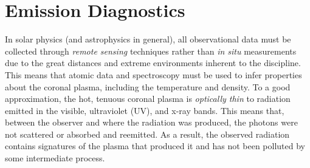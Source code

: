\chapter{Emission Diagnostics}
\label{ch:emission}
%
\par In solar physics (and astrophysics in general), all observational data must be collected through \textit{remote sensing} techniques rather than \textit{in situ} measurements due to the great distances and extreme environments inherent to the discipline. This means that atomic data and spectroscopy must be used to infer properties about the coronal plasma, including the temperature and density. To a good approximation, the hot, tenuous coronal plasma is \textit{optically thin} to radiation emitted in the visible, ultraviolet (UV), and x-ray bands. This means that, between the observer and where the radiation was produced, the photons were not scattered or absorbed and reemitted. As a result, the observed radiation contains signatures of the plasma that produced it and has not been polluted by some intermediate process.
%

